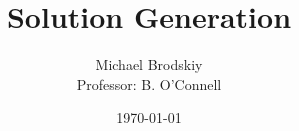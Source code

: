 


\title{Solution Generation}
\date{\today}
\author{Michael Brodskiy\\ \small Professor: B. O'Connell}



\maketitle

